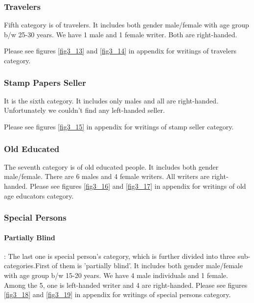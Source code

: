 \documentclass[a4paper,conference]{IEEEtran}
\begin{document}
\subsubsection{Travelers}
Fifth category is of travelers. It includes both gender male/female with age group b/w 25-30 years. We have 1 male and 1 female writer. Both are right-handed.

Please see figures \ref{fig3_13} and \ref{fig3_14} in appendix for writings of travelers category.


\subsubsection{Stamp Papers Seller}
It is the sixth category. It includes only males and all are right-handed. Unfortunately we couldn’t find any left-handed seller.

 Please see figures \ref{fig3_15} in appendix for writings of stamp seller category.
\subsubsection{Old Educated}
The seventh category is of old educated people. It includes both gender male/female. There are 6 males and 4 female writers. All writers are right-handed.
Please see figures \ref{fig3_16} and \ref{fig3_17} in appendix for writings of old age educators category.

\subsubsection{Special Persons}

\paragraph{Partially Blind}: The last one is special person’s category, which is further divided into three sub-categories.First of them is 'partially blind’. It includes both gender male/female with age group b/w 15-20 years. We have 4 male individuals and 1 female.  Among the 5, one is left-handed writer and 4 are right-handed. Please see figures \ref{fig3_18} and \ref{fig3_19} in appendix for writings of special persons category.
\end{document}
